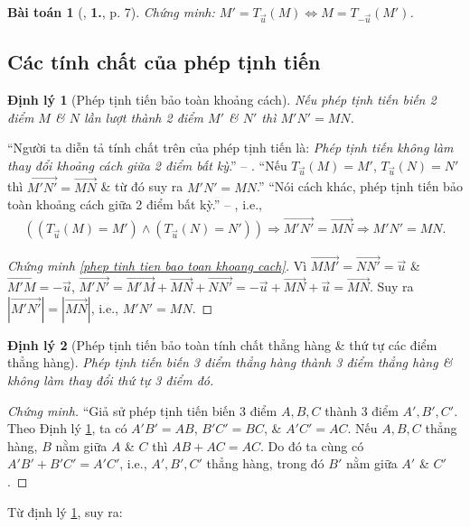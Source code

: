 \documentclass[oneside]{book}
\numberwithin{equation}{section}
\newtheorem{baitoan}{Bài toán}[section]
\newtheorem{dinhly}{Định lý}[section]
\begin{document}
\begin{baitoan}[\cite{SGK_Toan_11_dai_so_giai_tich_co_ban}, \textbf{1.}, p. 7]
	\label{prob:phep tinh tien}
	Chứng minh: $M' = T_{\vec{u}}(M)\Leftrightarrow M = T_{-\vec{u}}(M')$.
\end{baitoan}

\subsection{Các tính chất của phép tịnh tiến}

\begin{dinhly}[Phép tịnh tiến bảo toàn khoảng cách]
	\label{thm: phep tinh tien bao toan khoang cach}
	Nếu phép tịnh tiến biến 2 điểm $M$ \& $N$ lần lượt thành 2 điểm $M'$ \& $N'$ thì $M'N' = MN$.
\end{dinhly}
``Người ta diễn tả tính chất trên của phép tịnh tiến là: \textit{Phép tịnh tiến không làm thay đổi khoảng cách giữa 2 điểm bất kỳ}.'' -- \cite[p. 6]{SGK_Toan_11_hinh_hoc_nang_cao}. ``Nếu $T_{\vec{u}}(M) = M'$, $T_{\vec{u}}(N) = N'$ thì $\overrightarrow{M'N'} = \overrightarrow{MN}$ \& từ đó suy ra $M'N' = MN$.'' ``Nói cách khác, phép tịnh tiến bảo toàn khoảng cách giữa 2 điểm bất kỳ.'' -- \cite[p. 6]{SGK_Toan_11_hinh_hoc_co_ban}, i.e.,
\begin{align}
	\label{phep tinh tien bao toan khoang cach}
	((T_{\vec{u}}(M) = M')\land(T_{\vec{u}}(N) = N'))\Rightarrow\overrightarrow{M'N'} = \overrightarrow{MN}\Rightarrow M'N' = MN.
\end{align}

\begin{proof}[Chứng minh \eqref{phep tinh tien bao toan khoang cach}]
	Vì $\overrightarrow{MM'} = \overrightarrow{NN'} = \vec{u}$ \& $\overrightarrow{M'M} = -\vec{u}$, $\overrightarrow{M'N'} = \overrightarrow{M'M} + \overrightarrow{MN} + \overrightarrow{NN'} = -\vec{u} + \overrightarrow{MN} + \vec{u} = \overrightarrow{MN}$. Suy ra $|\overrightarrow{M'N'}| = |\overrightarrow{MN}|$, i.e., $M'N' = MN$.
\end{proof}

\begin{dinhly}[Phép tịnh tiến bảo toàn tính chất thẳng hàng \& thứ tự các điểm thẳng hàng]
	Phép tịnh tiến biến 3 điểm thẳng hàng thành 3 điểm thẳng hàng \& không làm thay đổi thứ tự 3 điểm đó.
\end{dinhly}

\begin{proof}[Chứng minh]
	``Giả sử phép tịnh tiến biến 3 điểm $A,B,C$ thành 3 điểm $A',B',C'$. Theo Định lý \ref{thm: phep tinh tien bao toan khoang cach}, ta có $A'B' = AB$, $B'C' = BC$, \& $A'C' = AC$. Nếu $A,B,C$ thẳng hàng, $B$ nằm giữa $A$ \& $C$ thì $AB + AC = AC$. Do đó ta cùng có $A'B' + B'C' = A'C'$, i.e., $A',B',C'$ thẳng hàng, trong đó $B'$ nằm giữa $A'$ \& $C'$.
\end{proof}
Từ định lý \ref{thm: phep tinh tien bao toan khoang cach}, suy ra:
\end{document}
